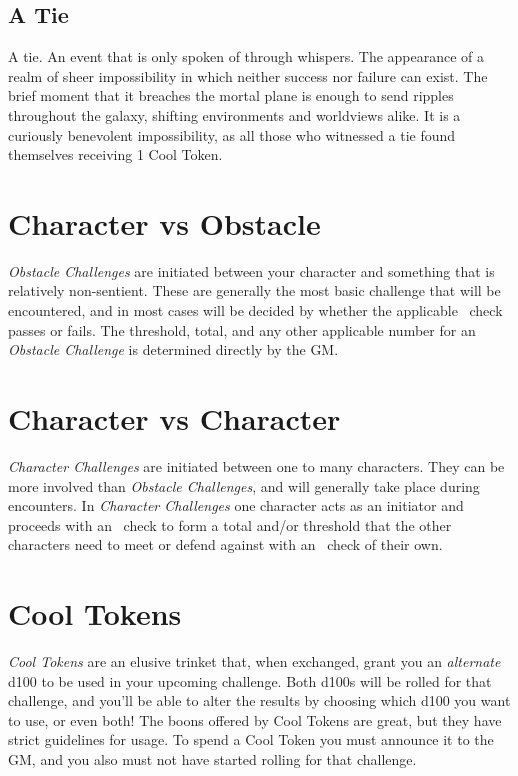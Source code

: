 \subsection{A Tie}\label{subsec:tie}
A tie. An event that is only spoken of through whispers. The appearance of a realm of sheer impossibility in which neither success nor failure can exist. The brief moment that it breaches the mortal plane is enough to send ripples throughout the galaxy, shifting environments and worldviews alike. It is a curiously benevolent impossibility, as all those who witnessed a tie found themselves receiving 1 Cool Token.

\section{Character vs Obstacle}\label{sec:vs_obstacle}
\emph{Obstacle Challenges} are initiated between your character and something that is relatively non-sentient. These are generally the most basic challenge that will be encountered, and in most cases will be decided by whether the applicable \attribute\ check passes or fails. The threshold, total, and any other applicable number for an \emph{Obstacle Challenge} is determined directly by the GM.

\section{Character vs Character}\label{sec:vs_character}
\emph{Character Challenges} are initiated between one to many characters. They can be more involved than \emph{Obstacle Challenges}, and will generally take place during encounters. In \emph{Character Challenges} one character acts as an initiator and proceeds with an \attribute\ check to form a total and/or threshold that the other characters need to meet or defend against with an \attribute\ check of their own. 

\section{Cool Tokens}\label{sec:cool_tokens}
\emph{Cool Tokens} are an elusive trinket that, when exchanged, grant you an \emph{alternate} d100 to be used in your upcoming challenge. Both d100s will be rolled for that challenge, and you'll be able to alter the results by choosing which d100 you want to use, or even both! The boons offered by Cool Tokens are great, but they have strict guidelines for usage. To spend a Cool Token you must announce it to the GM, and you also must not have started rolling for that challenge.

